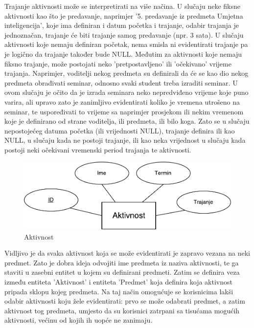 \documentclass[times, utf8, zavrsni]{fer}
\begin{document}
Trajanje aktivnosti može se interpretirati na više načina. U slučaju neke fiksne aktivnosti kao što je predavanje, naprimjer '5. predavanje iz predmeta Umjetna inteligencija', koje ima definiran i datum početka i trajanje, odabir trajanja je jednoznačan, trajanje će biti trajanje samog predavanje (npr. 3 sata). U slučaju aktivnosti koje nemaju definiran početak, nema smisla ni evidentirati trajanje pa je logično da trajanje također bude NULL. Međutim za aktivnosti koje nemaju fiksno trajanje, može postojati neko 'pretpostavljeno' ili 'očekivano' vrijeme trajanja. Naprimjer, voditelji nekog predmeta su definirali da će se kao dio nekog predmeta obrađivati seminar, odnosno svaki student treba izraditi seminar. U ovom slučaju je očito da je izrada seminara neko nepredviđeno vrijeme koje puno varira, ali upravo zato je zanimljivo evidentirati koliko je vremena utrošeno na seminar, te uspoređivati to vrijeme sa naprimjer prosjekom ili nekim vremenom koje je definirano od strane voditelja, ili predmeta, ili bilo koga. Zato se u slučaju nepostojećeg datuma početka (ili vrijednosti NULL), trajanje definira ili kao NULL, u slučaju kada ne postoji trajanje, ili kao neka vrijednost u slučaju kada postoji neki očekivani vremenski period trajanja te aktivnosti.

\begin{figure}[H]
\centering
\includegraphics[width=\textwidth,height=\textheight,keepaspectratio]{img/aktivnost.pdf}
\caption{Aktivnost}
\label{fig:aktivnost}
\end{figure}

Vidljivo je da svaka aktivnost koja se može evidentirati je zapravo vezana na neki predmet. Zato je dobra ideja odvojiti ime predmeta iz naziva aktivnosti, te ga staviti u zasebni entitet u kojem su definirani predmeti. Zatim se definira veza između entiteta 'Aktivnost' i entiteta 'Predmet' koja definira koja aktivnost pripada sklopu kojeg predmeta. Na taj način omogućuje se korisnicima lakši odabir aktivnosti koju žele evidentirati: prvo se može odabrati predmet, a zatim aktivnost tog predmeta, umjesto da su korisnici zatrpani sa tisućama mogućih aktivnosti, većinu od kojih ih uopće ne zanimaju.
\end{document}

